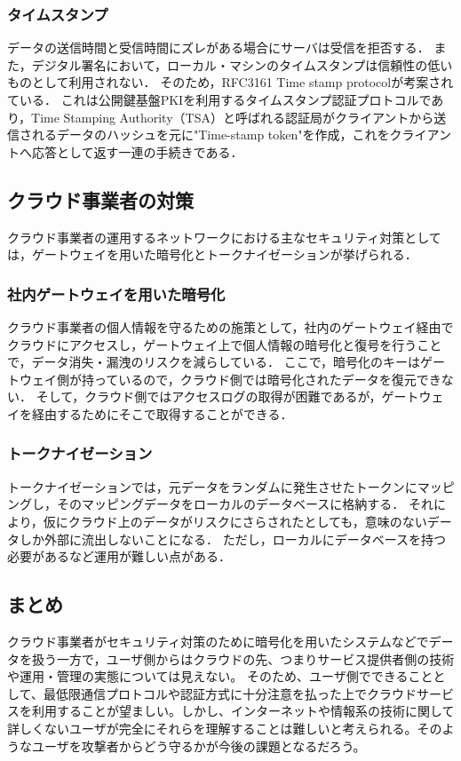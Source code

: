 \subsubsection{タイムスタンプ}
データの送信時間と受信時間にズレがある場合にサーバは受信を拒否する．
また，デジタル署名において，ローカル・マシンのタイムスタンプは信頼性の低いものとして利用されない．
そのため，RFC3161 Time stamp protocolが考案されている．
これは公開鍵基盤PKIを利用するタイムスタンプ認証プロトコルであり，Time Stamping Authority（TSA）と呼ばれる認証局がクライアントから送信されるデータのハッシュを元に"Time-stamp token"を作成，これをクライアントへ応答として返す一連の手続きである．


\subsection{クラウド事業者の対策}
クラウド事業者の運用するネットワークにおける主なセキュリティ対策としては，ゲートウェイを用いた暗号化とトークナイゼーションが挙げられる．

\subsubsection{社内ゲートウェイを用いた暗号化}
クラウド事業者の個人情報を守るための施策として，社内のゲートウェイ経由でクラウドにアクセスし，ゲートウェイ上で個人情報の暗号化と復号を行うことで，データ消失・漏洩のリスクを減らしている．
ここで，暗号化のキーはゲートウェイ側が持っているので，クラウド側では暗号化されたデータを復元できない．
そして，クラウド側ではアクセスログの取得が困難であるが，ゲートウェイを経由するためにそこで取得することができる．

\subsubsection{トークナイゼーション}
トークナイゼーションでは，元データをランダムに発生させたトークンにマッピングし，そのマッピングデータをローカルのデータベースに格納する．
それにより，仮にクラウド上のデータがリスクにさらされたとしても，意味のないデータしか外部に流出しないことになる．
ただし，ローカルにデータベースを持つ必要があるなど運用が難しい点がある．

\subsection{まとめ}
クラウド事業者がセキュリティ対策のために暗号化を用いたシステムなどでデータを扱う一方で，ユーザ側からはクラウドの先、つまりサービス提供者側の技術や運用・管理の実態については見えない。
そのため、ユーザ側でできることとして、最低限通信プロトコルや認証方式に十分注意を払った上でクラウドサービスを利用することが望ましい。しかし、インターネットや情報系の技術に関して詳しくないユーザが完全にそれらを理解することは難しいと考えられる。そのようなユーザを攻撃者からどう守るかが今後の課題となるだろう。

